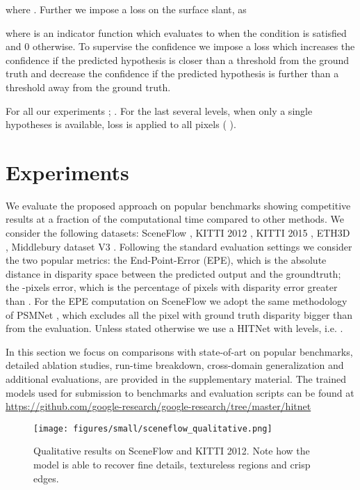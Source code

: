 \documentclass[final]{cvpr}
\begin{document}
where . Further we impose a loss on the surface slant, as

where  is an indicator function which evaluates to  when the condition is satisfied and 0 otherwise.
To supervise the confidence  we impose a loss which increases the confidence if the predicted hypothesis is closer than a threshold  from the ground truth and decrease the confidence if the predicted hypothesis is further than a threshold  away from the ground truth.

For all our experiments ; . For the last several levels, when only a single hypotheses is available, loss is applied to all pixels ( ).
 \section{Experiments}
We evaluate the proposed approach on popular benchmarks showing competitive results at a fraction of the computational time compared to other methods. We consider the following datasets: SceneFlow \cite{mayer2016large},  KITTI 2012 \cite{Geiger2012CVPR}, KITTI 2015 \cite{Menze2015ISA}, ETH3D \cite{schoeps2017cvpr}, Middlebury dataset V3 \cite{middlebury14}. Following the standard evaluation settings we consider the two popular metrics: the End-Point-Error (EPE), which is the absolute distance in disparity space between the predicted output and the groundtruth; the -pixels error, which is the percentage of pixels with disparity error greater than . For the EPE computation on SceneFlow we adopt the same methodology of PSMNet \cite{chang2018pyramid}, which excludes all the pixel with ground truth disparity bigger than  from the evaluation. Unless stated otherwise we use a HITNet with  levels, i.e. .

In this section we focus on comparisons with state-of-art on popular benchmarks, detailed ablation studies, run-time breakdown, cross-domain generalization and additional evaluations, are provided in the supplementary material. The trained models used for submission to benchmarks and evaluation scripts can be found at \href{https://github.com/google-research/google-research/tree/master/hitnet}{https://github.com/google-research/google-research/tree/master/hitnet}



\begin{figure*}[!htbp]
    \centering
    \texttt{[image: figures/small/sceneflow\_qualitative.png]}
    \caption{Qualitative results on SceneFlow and KITTI 2012. Note how the model is able to recover fine details, textureless regions and crisp edges. 
   }
    \label{fig:sceneflow}
    \vspace{-10pt}
\end{figure*}
\end{document}
